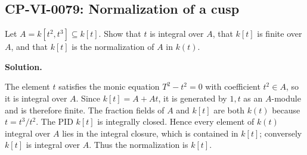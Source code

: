 
\subsection*{CP-VI-0079: Normalization of a cusp}

Let $A=k[t^2,t^3]\subseteq k[t]$. Show that $t$ is integral over $A$, that $k[t]$ is finite over $A$, and that $k[t]$ is the normalization of $A$ in $k(t)$.

\medskip
\noindent\textbf{Solution.}

The element $t$ satisfies the monic equation $T^2-t^2=0$ with coefficient $t^2\in A$, so it is integral over $A$. Since $k[t]=A+At$, it is generated by $1,t$ as an $A$-module and is therefore finite. The fraction fields of $A$ and $k[t]$ are both $k(t)$ because $t=t^3/t^2$. The PID $k[t]$ is integrally closed. Hence every element of $k(t)$ integral over $A$ lies in the integral closure, which is contained in $k[t]$; conversely $k[t]$ is integral over $A$. Thus the normalization is $k[t]$.

